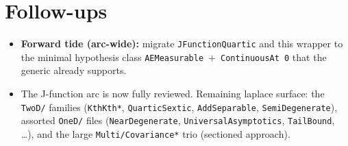\documentclass[11pt]{article}
\begin{document}
\section{Follow-ups}
\begin{itemize}[noitemsep]
  \item \textbf{Forward tide (arc-wide):} migrate \texttt{JFunctionQuartic} and this wrapper to the minimal
    hypothesis class \texttt{AEMeasurable}~$+$~\texttt{ContinuousAt 0} that the generic already supports.
  \item The J-function arc is now fully reviewed. Remaining laplace surface: the \texttt{TwoD/} families
    (\texttt{KthKth*}, \texttt{QuarticSextic}, \texttt{AddSeparable}, \texttt{SemiDegenerate}), assorted
    \texttt{OneD/} files (\texttt{NearDegenerate}, \texttt{UniversalAsymptotics}, \texttt{TailBound}, \dots),
    and the large \texttt{Multi/Covariance*} trio (sectioned approach).
\end{itemize}
\end{document}
